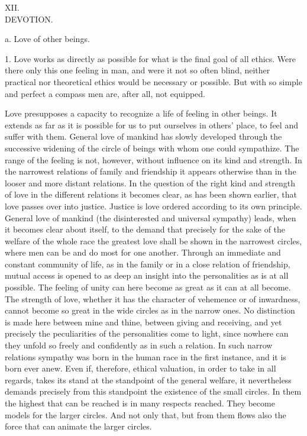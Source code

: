 \documentclass[12pt,a4paper,openany]{book}
\newcommand{\opage}[1]{\marginnote{\footnotesize\textit{[#1]}}}
\newcounter{etikch}
\newcommand{\chapterhead}[2]{\stepcounter{etikch}\bigskip\begin{center}\pdfbookmark[1]{#1 #2}{etikch.\arabic{etikch}}#1\\[3pt]{\large #2}\end{center}\medskip}
\begin{document}
\chapterhead{XII.}{DEVOTION.}

\begin{center}a. Love of other beings.\end{center}

1. Love works as directly as possible for what is the final goal of all ethics. Were there only this one feeling
in man, and were it not so often blind, neither practical nor theoretical ethics would be necessary or possible.
But with so simple and perfect a compass men are, after all, not equipped.

Love presupposes a capacity to recognize a life of feeling in other beings. It extends as far as it
\opage{237}is possible for us to put ourselves in others' place, to feel and suffer with them. General love of mankind
has slowly developed through the successive widening of the circle of beings with whom one could sympathize. The
range of the feeling is not, however, without influence on its kind and strength. In the narrowest relations of
family and friendship it appears otherwise than in the looser and more distant relations. In the question of the
right kind and strength of love in the different relations it becomes clear, as has been shown earlier, that love
passes over into justice. Justice is love ordered according to its own principle. General love of mankind (the
disinterested and universal sympathy) leads, when it becomes clear about itself, to the demand that precisely for
the sake of the welfare of the whole race the greatest love shall be shown in the narrowest circles, where men can
be and do most for one another. Through an immediate and constant community of life, as in the family or in a close
relation of friendship, mutual access is opened to as deep an insight into the personalities as is at all possible.
The feeling of unity can here become as great as it can at all become. The strength of love, whether it has the
character of vehemence or of inwardness, cannot become so great in the wide circles as in the narrow ones. No
distinction is made here between mine and thine, between giving and receiving, and yet precisely the peculiarities
of the personalities come to light, since nowhere can they unfold so freely and confidently as in such a relation.
In such narrow relations sympathy was born in the human race in the first instance, and it is born ever anew. Even
if, therefore, ethical valuation, in order to take in all regards, takes its stand at the standpoint of the general
welfare, it nevertheless demands precisely from this standpoint the existence of the small circles. In them the
highest that can be reached is in many respects reached. They become models for the larger circles. And not only
that, but from them flows also the force that can animate the larger circles.
\end{document}
